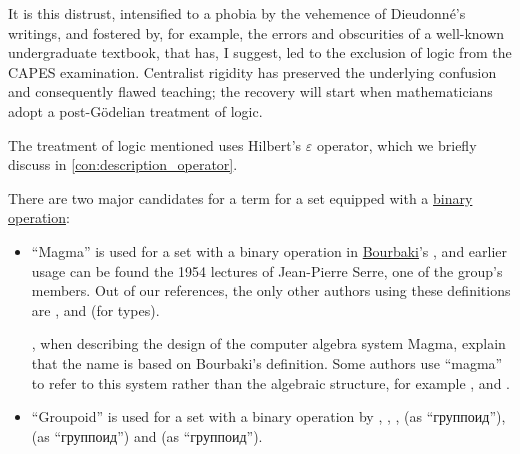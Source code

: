 \begin{remark}
\begin{displayquote}
    It is this distrust, intensified to a phobia by the vehemence of Dieudonn\'e's writings, and fostered by, for example, the errors and obscurities of a well-known undergraduate textbook, that has, I suggest, led to the exclusion of logic from the CAPES examination. Centralist rigidity has preserved the underlying confusion and consequently flawed teaching; the recovery will start when mathematicians adopt a post-G\"odelian treatment of logic.
  \end{displayquote}

  The treatment of logic mentioned uses Hilbert's \( \varepsilon \) operator, which we briefly discuss in \cref{con:description_operator}.
\end{remark}

\begin{remark}\label{rem:magma_terminology}
  There are two major candidates for a term for a set equipped with a \hyperref[def:binary_operation]{binary operation}:
  \begin{itemize}
    \item \enquote{Magma} is used for a set with a binary operation in \hyperref[rem:bourbaki]{Bourbaki}'s \cite[def. A I.1]{Bourbaki1970Algèbre1à3}, and earlier usage can be found the 1954 lectures \cite[18]{Serre1992LieGroups} of Jean-Pierre Serre, one of the group's members. Out of our references, the only other authors using these definitions are ,  and  (for types).

    , when describing the design of the computer algebra system Magma, explain that the name is based on Bourbaki's definition. Some authors use \enquote{magma} to refer to this system rather than the algebraic structure, for example ,  and .

    \item \enquote{Groupoid} is used for a set with a binary operation by
    ,
    ,
    ,
     (as \enquote{группоид}),
     (as \enquote{группоид}) and
     (as \enquote{группоид}).


\end{itemize}
\end{remark}
